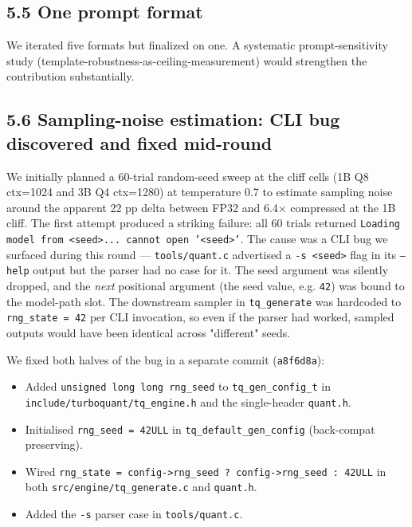 \documentclass[11pt]{article}
\begin{document}
\subsection*{5.5 One prompt format}


We iterated five formats but finalized on one. A systematic prompt-sensitivity study (template-robustness-as-ceiling-measurement) would strengthen the contribution substantially.


\subsection*{5.6 Sampling-noise estimation: CLI bug discovered and fixed mid-round}


We initially planned a 60-trial random-seed sweep at the cliff cells (1B Q8 ctx=1024 and 3B Q4 ctx=1280) at temperature 0.7 to estimate sampling noise around the apparent 22 pp delta between FP32 and 6.4× compressed at the 1B cliff. The first attempt produced a striking failure: all 60 trials returned \texttt{Loading model from <seed>... cannot open '<seed>'}. The cause was a CLI bug we surfaced during this round — \texttt{tools/quant.c} advertised a \texttt{-s <seed>} flag in its \texttt{--help} output but the parser had no case for it. The seed argument was silently dropped, and the \textit{next} positional argument (the seed value, e.g. \texttt{42}) was bound to the model-path slot. The downstream sampler in \texttt{tq\_generate} was hardcoded to \texttt{rng\_state = 42} per CLI invocation, so even if the parser had worked, sampled outputs would have been identical across "different" seeds.


We fixed both halves of the bug in a separate commit (\texttt{a8f6d8a}):

\begin{itemize}
\item Added \texttt{unsigned long long rng\_seed} to \texttt{tq\_gen\_config\_t} in \texttt{include/turboquant/tq\_engine.h} and the single-header \texttt{quant.h}.
\item Initialised \texttt{rng\_seed = 42ULL} in \texttt{tq\_default\_gen\_config} (back-compat preserving).
\item Wired \texttt{rng\_state = config->rng\_seed ? config->rng\_seed : 42ULL} in both \texttt{src/engine/tq\_generate.c} and \texttt{quant.h}.
\item Added the \texttt{-s} parser case in \texttt{tools/quant.c}.
\end{itemize}
\end{document}
